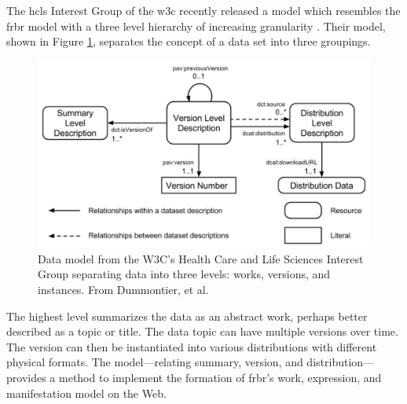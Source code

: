 The \gls{hcls} Interest Group of the \gls{w3c} recently released a model which resembles the \gls{frbr} model with a three level hierarchy of increasing granularity \cite{Dummontier2016}.
Their model, shown in Figure \ref{HCLSModel}, separates the concept of a data set into three groupings.
\begin{figure}%
	\centering
	\includegraphics[scale=0.34]{figures/HCLSModel.png}
	\caption[Data model from the W3C's Health Care and Life Sciences Interest Group separating data into three levels: works, versions, and instances.]{Data model from the W3C's Health Care and Life Sciences Interest Group separating data into three levels: works, versions, and instances.  From Dummontier, et al. \cite{Dummontier2016}}
	\label{HCLSModel}
\end{figure}
The highest level summarizes the data as an abstract work, perhaps better described as a topic or title.
The data topic can have multiple versions over time.
The version can then be instantiated into various distributions with different physical formats.
The model---relating summary, version, and distribution---provides a method to implement the formation of \gls{frbr}'s work, expression, and manifestation model on the Web.

